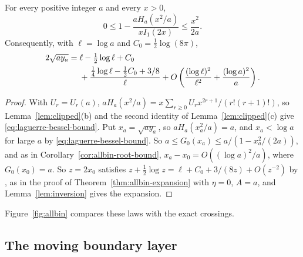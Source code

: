 \begin{theorem}\label{thm:edge-matching}
For every positive integer $a$ and every $x>0$,
\begin{equation}\label{eq:laguerre-bessel-bound}
 0\le1-\frac{aH_a(x^2/a)}{xI_1(2x)}\le\frac{x^2}{2a}.
\end{equation}
Consequently, with $\ell=\log a$ and $C_0=\tfrac12\log(8\pi)$,
\begin{align}
 2\sqrt{a y_a}
 ={}&\ell-\tfrac12\log\ell+C_0\notag\\
 &+\frac{\tfrac14\log\ell-\tfrac12C_0+3/8}{\ell}
 +O\left(\frac{(\log\ell)^2}{\ell^2}+\frac{(\log a)^2}{a}\right).
 \label{eq:edge-matching-expansion}
\end{align}
\end{theorem}
\begin{proof}
With $U_r=U_r(a)$, $aH_a(x^2/a)=x\sum_{r\ge0}U_rx^{2r+1}/(r!(r+1)!)$, so
Lemma~\ref{lem:clipped}(b) and the second identity of
Lemma~\ref{lem:clipped}(c) give \eqref{eq:laguerre-bessel-bound}. Put
$x_a=\sqrt{ay_a}$, so $aH_a(x_a^2/a)=a$, and $x_a<\log a$ for large $a$ by
\eqref{eq:laguerre-bessel-bound}. So $a\le G_0(x_a)\le a/(1-x_a^2/(2a))$, and as in
Corollary~\ref{cor:allbin-root-bound},
$x_a-x_0=O((\log a)^2/a)$, where $G_0(x_0)=a$. So $z=2x_0$ satisfies
$z+\frac12\log z=\ell+C_0+3/(8z)+O(z^{-2})$ by \cite[Eq.~10.40.1]{dlmf}, as in
the proof of Theorem~\ref{thm:allbin-expansion} with $\eta=0$, $A=a$, and
Lemma~\ref{lem:inversion} gives the expansion.
\end{proof}

Figure~\ref{fig:allbin} compares these laws with the exact crossings.

\subsection{The moving boundary layer}

